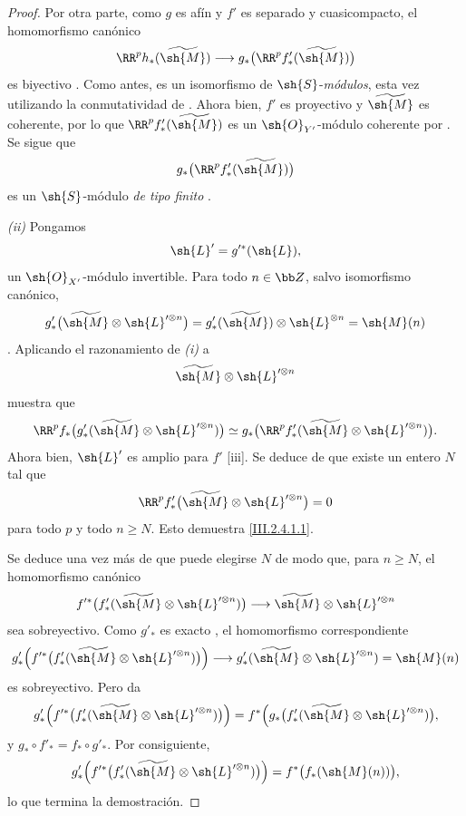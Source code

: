 \documentclass[oneside]{amsart}
\renewcommand{\geq}{\geqslant}
\begin{document}
\begin{proof}
Por otra parte, como $g$ es afín y $f'$ es separado y cuasicompacto, el homomorfismo canónico
\[
  \RR^p h_*(\widetilde{\sh{M}})
  \longrightarrow
  g_*\bigl(\RR^p f'_*(\widetilde{\sh{M}})\bigr)
\]
es biyectivo .
Como antes, es un isomorfismo de $\sh{S}$-\emph{módulos}, esta vez utilizando la conmutatividad de .
Ahora bien, $f'$ es proyectivo y $\widetilde{\sh{M}}$ es coherente, por lo que $\RR^p f'_*(\widetilde{\sh{M}})$ es un $\sh{O}_{Y'}$-módulo coherente por .
Se sigue que
\[
  g_*\bigl(\RR^p f'_*(\widetilde{\sh{M}})\bigr)
\]
es un $\sh{S}$-módulo \emph{de tipo finito} .

\emph{(ii)} Pongamos
\[
  \sh{L}'=g'^*(\sh{L}),
\]
un $\sh{O}_{X'}$-módulo invertible.
Para todo $n\in\bb Z$, salvo isomorfismo canónico,
\[
  g'_*\bigl(\widetilde{\sh{M}}\otimes\sh{L}'^{\otimes n}\bigr)
  =
  g'_*(\widetilde{\sh{M}})\otimes\sh{L}^{\otimes n}
  =
  \sh{M}(n)
\]
.
Aplicando el razonamiento de \emph{(i)} a
\[
  \widetilde{\sh{M}}\otimes\sh{L}'^{\otimes n}
\]
muestra que
\[
  \RR^p f_*
  \bigl(g'_*(\widetilde{\sh{M}}\otimes\sh{L}'^{\otimes n})\bigr)
  \simeq
  g_*\bigl(\RR^p f'_*
  (\widetilde{\sh{M}}\otimes\sh{L}'^{\otimes n})\bigr).
\]
Ahora bien, $\sh{L}'$ es amplio para $f'$ [iii].
Se deduce de  que existe un entero $N$ tal que
\[
  \RR^p f'_*
  \bigl(\widetilde{\sh{M}}\otimes\sh{L}'^{\otimes n}\bigr)=0
\]
para todo $p$ y todo $n\geq N$.
Esto demuestra \eqref{III.2.4.1.1}.

Se deduce una vez más de  que puede elegirse $N$ de modo que, para $n\geq N$, el homomorfismo canónico
\[
  f'^*\bigl(f'_*(\widetilde{\sh{M}}\otimes\sh{L}'^{\otimes n})\bigr)
  \longrightarrow
  \widetilde{\sh{M}}\otimes\sh{L}'^{\otimes n}
\]
sea sobreyectivo.
Como $g'_*$ es exacto , el homomorfismo correspondiente
\[
  g'_*\Bigl(
    f'^*\bigl(f'_*(\widetilde{\sh{M}}\otimes\sh{L}'^{\otimes n})\bigr)
  \Bigr)
  \longrightarrow
  g'_*(\widetilde{\sh{M}}\otimes\sh{L}'^{\otimes n})
  =\sh{M}(n)
\]
es sobreyectivo.
Pero  da
\[
  g'_*\Bigl(
    f'^*\bigl(f'_*(\widetilde{\sh{M}}\otimes\sh{L}'^{\otimes n})\bigr)
  \Bigr)
  =
  f^*\Bigl(
    g_*\bigl(f'_*(\widetilde{\sh{M}}\otimes\sh{L}'^{\otimes n})\bigr),
\]
y $g_*\circ f'_*=f_*\circ g'_*$.
Por consiguiente,
\[
  g'_*\Bigl(
    f'^*\bigl(f'_*(\widetilde{\sh{M}}\otimes\sh{L}'^{\otimes n})\bigr)
  \Bigr)
  =
  f^*\bigl(f_*(\sh{M}(n))\bigr),
\]
lo que termina la demostración.
\end{proof}
\end{document}
